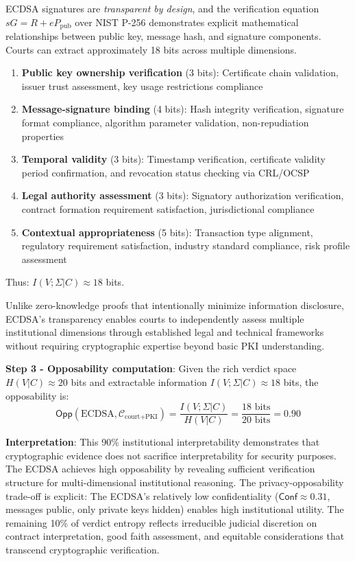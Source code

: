 \documentclass{ieeeaccess}
\begin{document}
ECDSA signatures are \emph{transparent by design}, and the verification equation $sG = R + eP_{\text{pub}}$ over NIST P-256 demonstrates explicit mathematical relationships between public key, message hash, and signature components. Courts can extract approximately 18 bits across multiple dimensions.

\begin{enumerate}
\item \textbf{Public key ownership verification} (3 bits): Certificate chain validation, issuer trust assessment, key usage restrictions compliance
\item \textbf{Message-signature binding} (4 bits): Hash integrity verification, signature format compliance, algorithm parameter validation, non-repudiation properties
\item \textbf{Temporal validity} (3 bits): Timestamp verification, certificate validity period confirmation, and revocation status checking via CRL/OCSP
\item \textbf{Legal authority assessment} (3 bits): Signatory authorization verification, contract formation requirement satisfaction, jurisdictional compliance
\item \textbf{Contextual appropriateness} (5 bits): Transaction type alignment, regulatory requirement satisfaction, industry standard compliance, risk profile assessment
\end{enumerate}

Thus: $I(V;\Sigma|C) \approx 18$ bits.

Unlike zero-knowledge proofs that intentionally minimize information disclosure, ECDSA's transparency enables courts to independently assess multiple institutional dimensions through established legal and technical frameworks without requiring cryptographic expertise beyond basic PKI understanding.

\textbf{Step 3 - Opposability computation}: Given the rich verdict space $H(V|C) \approx 20$ bits 
and extractable information $I(V;\Sigma|C) \approx 18$ bits, the opposability is:
\begin{equation}
\mathsf{Opp}(\text{ECDSA}, \mathcal{C}_{\text{court+PKI}}) = \frac{I(V;\Sigma|C)}{H(V|C)} 
= \frac{18 \text{ bits}}{20 \text{ bits}} = 0.90
\end{equation}

\textbf{Interpretation}: This 90\% institutional interpretability demonstrates that cryptographic evidence does not sacrifice interpretability for security purposes. The ECDSA achieves high opposability by revealing sufficient verification structure for multi-dimensional institutional reasoning. The privacy-opposability trade-off is explicit: The ECDSA's relatively low confidentiality ($\mathsf{Conf} \approx 0.31$, messages public, only private keys hidden) enables high institutional utility. The remaining 10\% of verdict entropy reflects irreducible judicial discretion on contract interpretation, good faith assessment, and equitable considerations that transcend cryptographic verification.
\end{document}
